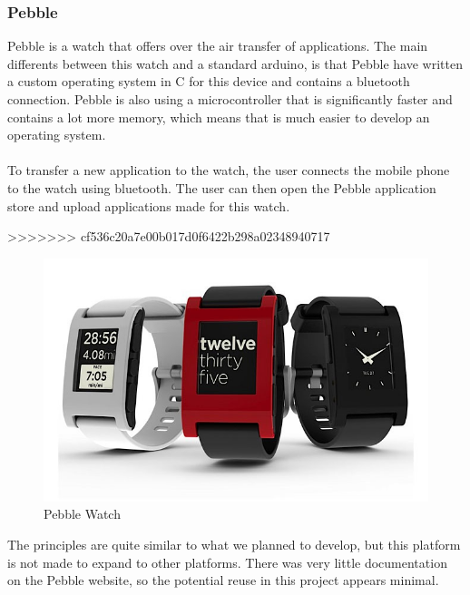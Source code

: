 \subsubsection{Pebble}
Pebble is a watch that offers over the air transfer of applications. The main differents between this watch and a standard arduino, is that Pebble have written a custom operating system in C for this device and contains a bluetooth connection. Pebble is also using a microcontroller that is significantly faster and contains a lot more memory, which means that is much easier to develop an operating system.\\
\\
To transfer a new application to the watch, the user connects the mobile phone to the watch using bluetooth. The user can then open the Pebble application store and upload applications made for this watch.

>>>>>>> cf536c20a7e00b017d0f6422b298a02348940717

\begin{figure}[H]
\includegraphics[scale=0.7]{images/Pebble-Smartphone-Watch.jpeg}
\caption{Pebble Watch}
\end{figure}
The principles are quite similar to what we planned to develop, but this platform is not made to expand to other platforms. There was very little documentation on the Pebble website, so the potential reuse in this project appears minimal.

